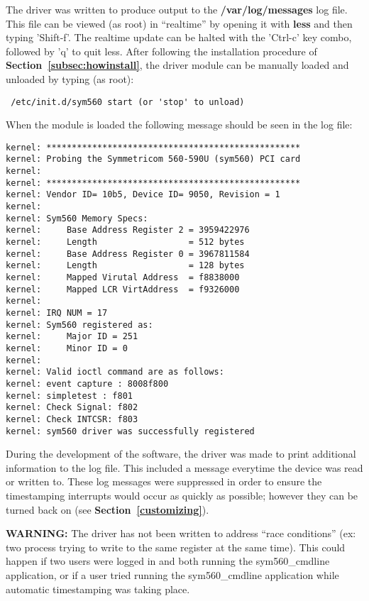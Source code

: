 \documentclass[11pt]{article}
\begin{document}
    The driver was written to produce output to the \textbf{/var/log/messages} log file. This file can be viewed (as root) in ``realtime'' by opening it with \textbf{less} and then typing 'Shift-f'. The realtime update can be halted with the 'Ctrl-c' key combo, followed by 'q' to quit less. After following the installation procedure of \textbf{Section~\ref{subsec:howinstall}}, the driver module can be manually loaded and unloaded by typing (as root):
    \begin{verbatim}
 /etc/init.d/sym560 start (or 'stop' to unload)
    \end{verbatim}
    When the module is loaded the following message should be seen in the log file:
    \begin{small}
        \begin{verbatim}
kernel: **************************************************
kernel: Probing the Symmetricom 560-590U (sym560) PCI card
kernel:
kernel: **************************************************
kernel: Vendor ID= 10b5, Device ID= 9050, Revision = 1
kernel:
kernel: Sym560 Memory Specs:
kernel:     Base Address Register 2 = 3959422976
kernel:     Length                  = 512 bytes
kernel:     Base Address Register 0 = 3967811584
kernel:     Length                  = 128 bytes
kernel:     Mapped Virutal Address  = f8838000
kernel:     Mapped LCR VirtAddress  = f9326000
kernel:
kernel: IRQ NUM = 17
kernel: Sym560 registered as:
kernel:     Major ID = 251
kernel:     Minor ID = 0
kernel:
kernel: Valid ioctl command are as follows:
kernel: event capture : 8008f800
kernel: simpletest : f801
kernel: Check Signal: f802
kernel: Check INTCSR: f803
kernel: sym560 driver was successfully registered
        \end{verbatim}
    \end{small}

    During the development of the software, the driver was made to print additional information to the log file. This included a message everytime the device was read or written to. These log messages were suppressed in order to ensure the timestamping interrupts would occur as quickly as possible; however they can be turned back on (see \textbf{Section~\ref{customizing}}).

    \noindent \textbf{WARNING:} The driver has not been written to address ``race conditions'' (ex: two process trying to write to the same register at the same time). This could happen if two users were logged in and both running the sym560\_cmdline application, or if a user tried running the sym560\_cmdline application while automatic timestamping was taking place.
\end{document}
